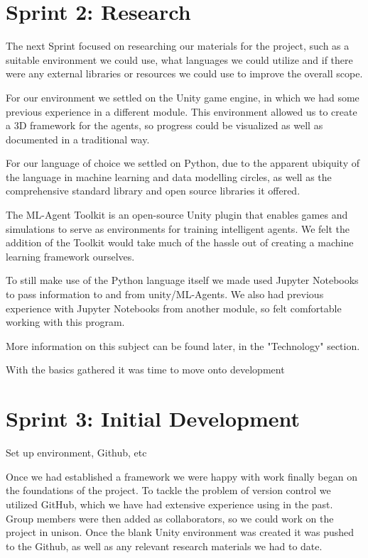 \section{Sprint 2: Research}
	
	The next Sprint focused on researching our materials for the project, such as a suitable environment we could use, what languages we could utilize and if there were any external libraries or resources we could use to improve the overall scope.
	
	For our environment we settled on the Unity game engine, in which we had some previous experience in a different module. This environment allowed us to create a 3D framework for the agents, so progress could be visualized as well as documented in a traditional way. 
	
	For our language of choice we settled on Python, due to the apparent ubiquity of the language in machine learning and data modelling circles, as well as the comprehensive standard library and open source libraries it offered.

	The ML-Agent Toolkit is an open-source Unity plugin that enables games and simulations to serve as environments for training intelligent agents. We felt the addition of the Toolkit would take much of the hassle out of creating a machine learning framework ourselves.
	
	To still make use of the Python language itself we made used  Jupyter Notebooks to pass information to and from unity/ML-Agents. We also had previous experience with Jupyter Notebooks from another module, so felt comfortable working with this program.
	
	More information on this subject can be found later, in the "Technology" section.
	
	With the basics gathered it was time to move onto development
	

\section{Sprint 3: Initial Development}
	Set up environment, Github, etc
	
	Once we had established a framework we were happy with work finally began on the foundations of the project. To tackle the problem of version control we utilized GitHub, which we have had extensive experience using in the past. Group members were then added as collaborators, so we could work on the project in unison.  Once the blank Unity environment was created it was pushed to the Github, as well as any relevant research materials we had to date.
	
